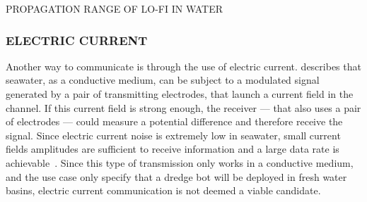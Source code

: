 \begin{RoyalFigure}[!htb, label=fig:propagationrange]{PROPAGATION RANGE OF LO-FI IN WATER}
\end{RoyalFigure}

\subsubsection{ELECTRIC CURRENT}\label{sec:ec}
Another way to communicate is through the use of electric current. \citet{hagman_elias_design_2009} describes that 
seawater, as a conductive medium, can be subject to a modulated signal generated by a pair of transmitting 
electrodes, that launch a current field in the channel. If this current field is strong enough, the receiver --- that
also uses a pair of electrodes --- could measure a potential difference and therefore receive the signal. Since 
electric current noise is extremely low in seawater, small current fields amplitudes are sufficient to receive 
information and a large data rate is achievable~\cite{hagman_elias_design_2009}.
Since this type of transmission only works in a conductive medium, and the use case only specify that a dredge bot 
will be deployed in fresh water basins, electric current communication is not deemed a viable candidate.

